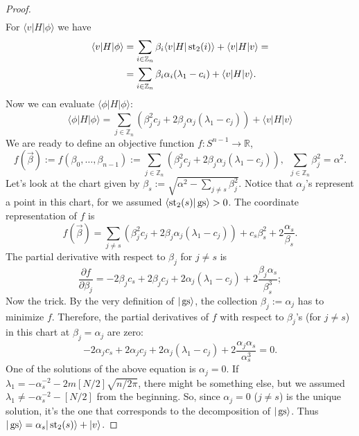 \begin{proof}
\[\begin{split}
\end{split}
\]
For $\langle v | H |\phi \rangle$ we have
\[\begin{split}
\langle v | H | \phi \rangle& = \sum_{i \in \mathbb Z_n}\beta_i\langle v | H|\operatorname{st}_2(i)\rangle + \langle v |H|v \rangle = \\ &= \sum_{i \in \mathbb Z_n}\beta_i\alpha_i(\lambda_1 - c_i) + \langle v |H|v \rangle.
\end{split}
\]
Now we can evaluate $\langle \phi | H| \phi \rangle$:
\[
\langle \phi | H| \phi \rangle = \sum_{j \in \mathbb Z_n} \left(\beta_j^2 c_j + 2\beta_j\alpha_j(\lambda_1-c_j) \right) + \langle v |H|v \rangle 
\]
We are ready to define an objective function $f: S^{n-1} \rightarrow \mathbb R$,
\[
f(\vec{\beta}) := f(\beta_0,\ldots,\beta_{n-1}) := \sum_{j \in \mathbb Z_n} (\beta_j^2 c_j + 2\beta_j\alpha_j(\lambda_1-c_j))
, \ \ \sum_{j\in \mathbb Z_n} \beta_j^2 = \alpha^2.
\]
Let's look at the chart given by $\beta_s := \sqrt{\alpha^2 - \sum_{j \neq s} \beta_j^2}$. Notice that $\alpha_j$'s represent a point in this chart, for we assumed $\langle \operatorname{st}_2(s)|\operatorname{gs} \rangle > 0$. The coordinate representation of $f$ is 
\[
f(\vec{\beta}) = \sum_{j\neq s} (\beta_j^2 c_j + 2\beta_j \alpha_j(\lambda_1 - c_j)) + c_s\beta_s^2 + 2\frac{\alpha_s}{\beta_s}.%
\]
The partial derivative with respect to $\beta_j$ for $j \neq s$ is
\[
\frac{\partial f}{\partial \beta_j} = -2\beta_jc_s + 2\beta_j c_j + 2\alpha_j(\lambda_1-c_j) + 2\frac{\beta_j\alpha_s}{\beta_s^3};
\]
Now the trick. By the very definition of $|\operatorname{gs}\rangle$, the collection $\beta_j := \alpha_j$ has to minimize $f$. Therefore, the partial derivatives of $f$ with respect to $\beta_j$'s (for $j \neq s$) in this chart at $\beta_j = \alpha_j$ are zero:
\[
-2\alpha_jc_s + 2\alpha_j c_j + 2\alpha_j(\lambda_1-c_j) + 2\frac{\alpha_j\alpha_s}{\alpha_s^3} = 0.
\]
One of the solutions of the above equation is $\alpha_j = 0$. If $\lambda_1 = - \alpha_s^{-2} -2m[N/2]\sqrt{n/2\pi}$, there might be something else, but we assumed $\lambda_1 \neq - \alpha_s^{-2}-[N/2]$ from the beginning. So, since $\alpha_j = 0$ ($j \neq s$) is the unique solution, it's the one that corresponds to the decomposition of $|\operatorname{gs} \rangle$. Thus $|\operatorname{gs}\rangle = \alpha_s |\operatorname{st}_2(s)\rangle + |v\rangle$.
\end{proof}


